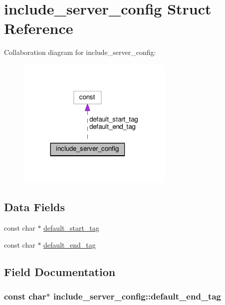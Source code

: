\hypertarget{structinclude__server__config}{}\section{include\+\_\+server\+\_\+config Struct Reference}
\label{structinclude__server__config}


Collaboration diagram for include\+\_\+server\+\_\+config\+:
\nopagebreak
\begin{figure}[H]
\begin{center}
\leavevmode
\includegraphics[width=212pt]{structinclude__server__config__coll__graph}
\end{center}
\end{figure}
\subsection*{Data Fields}
\begin{DoxyCompactItemize}
\item 
const char $\ast$ \hyperlink{structinclude__server__config_ae7fd02881fcaabed109fefa1f6941c4c}{default\+\_\+start\+\_\+tag}
\item 
const char $\ast$ \hyperlink{structinclude__server__config_a8bf6386c25054200f397ee1d540a3c13}{default\+\_\+end\+\_\+tag}
\end{DoxyCompactItemize}


\subsection{Field Documentation}
\subsubsection[{\texorpdfstring{default\+\_\+end\+\_\+tag}{default_end_tag}}]{\setlength{\rightskip}{0pt plus 5cm}const char$\ast$ include\+\_\+server\+\_\+config\+::default\+\_\+end\+\_\+tag}\hypertarget{structinclude__server__config_a8bf6386c25054200f397ee1d540a3c13}{}\label{structinclude__server__config_a8bf6386c25054200f397ee1d540a3c13}
